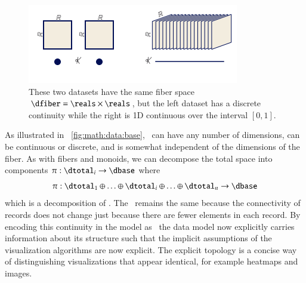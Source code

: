 \documentclass[journal]{vgtc}                %
\begin{document}
 \begin{figure}[htb]
  \centering %
  \includegraphics[width=\columnwidth]{base.png}
  \caption{These two datasets have the same fiber space  $\dfiber=\reals\times\reals$, but the left dataset has a discrete continuity while the right is 1D continuous over the interval $\left[0,1\right]$.}
  \label{fig:math:data:base}
 \end{figure}

 As illustrated in ~\autoref{fig:math:data:base}, \dbase\ can have any number of dimensions, can be continuous or discrete, and is somewhat independent of the dimensions of the fiber. As with fibers and monoids, we can decompose the total space into components $\pi:\dtotal_i\rightarrow \dbase$ where
 \begin{equation}
    \label{eq:math:data:base:decompose}
     \pi:\dtotal_1\oplus\ldots\oplus \dtotal_i \oplus\ldots \oplus \dtotal_n \rightarrow \dbase
 \end{equation}
 which is a decomposition of \dfiber. The \dbase\ remains the same because the connectivity of records does not change just because there are fewer elements in each record. By encoding this continuity in the model as \dbase\, the data model now explicitly carries information about its structure such that the implicit assumptions of the visualization algorithms are now explicit. The explicit topology is a concise way of distinguishing visualizations that appear identical, for example heatmaps and images.  
\end{document}
